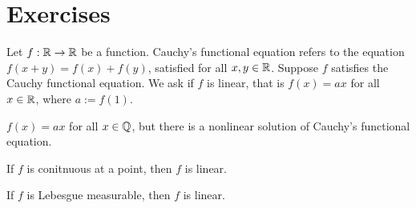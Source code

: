 \documentclass{../../large}
\begin{document}
\section*{Exercises}
\begin{prb}
Let $f:\mathbb{R}\to\mathbb{R}$ be a function.
Cauchy's functional equation refers to the equation $f(x+y)=f(x)+f(y)$, satisfied for all $x,y\in\mathbb{R}$.
Suppose $f$ satisfies the Cauchy functional equation.
We ask if $f$ is linear, that is $f(x)=ax$ for all $x\in\mathbb{R}$, where $a:=f(1)$.
\begin{parts}
\item $f(x)=ax$ for all $x\in\mathbb{Q}$, but there is a nonlinear solution of Cauchy's functional equation.
\item If $f$ is conitnuous at a point, then $f$ is linear.
\item If $f$ is Lebesgue measurable, then $f$ is linear.
\end{parts}
\end{prb}
\end{document}
